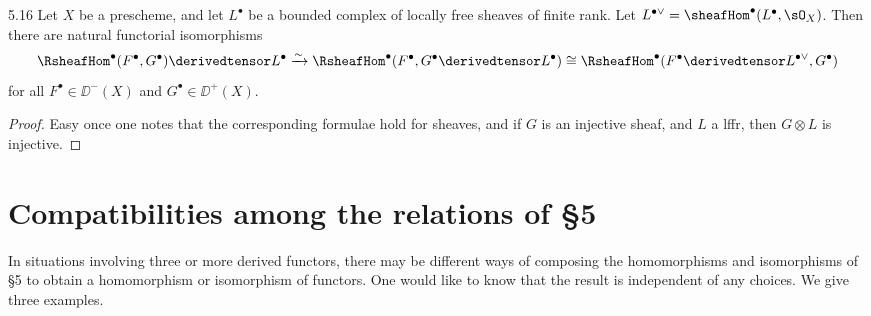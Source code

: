 \begin{bookproposition}{5.16}\label{prop:2.5.16}
Let $X$ be a prescheme, and let $L^\bullet$ be a bounded complex of locally free sheaves of finite rank. Let $L^{\bullet\vee}=\sheafHom^\bullet(L^\bullet,\sO_X)$. Then there are natural functorial isomorphisms
\[
\RsheafHom^\bullet(F^\bullet,G^\bullet)\derivedtensor L^\bullet \xrightarrow{\sim} \RsheafHom^\bullet(F^\bullet,G^\bullet\derivedtensor L^\bullet) \cong \RsheafHom^\bullet(F^\bullet\derivedtensor L^{\bullet\vee},G^\bullet)
\]
for all $F^\bullet\in\DD^-(X)$ and $G^\bullet\in\DD^+(X)$.
\end{bookproposition}

\begin{proof}
Easy once one notes that the corresponding formulae hold for sheaves, and if $G$ is an injective sheaf, and $L$ a lffr, then $G\otimes L$ is injective.
\end{proof}

\section{Compatibilities among the relations of \S5}\label{sec:2.6}

In situations involving three or more derived functors, there may be different ways of composing the homomorphisms and isomorphisms of \S5 to obtain a homomorphism or isomorphism of functors. One would like to know that the result is independent of any choices. We give three examples.

